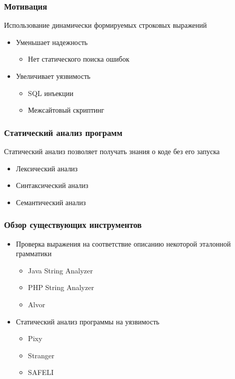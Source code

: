 \documentclass{beamer}
\begin{document}
\begin{frame}
\transwipe[direction=90]
\frametitle{Мотивация}
Использование динамически формируемых строковых выражений
\begin{itemize}
\item Уменьшает надежность
\begin{itemize}
\item Нет статического поиска ошибок
\end{itemize}
\item Увеличивает уязвимость
\begin{itemize}
\item SQL инъекции
\item Межсайтовый скриптинг
\end{itemize}
\end{itemize}
\end{frame}


\begin{frame}
\transwipe[direction=90]
\frametitle{Статический анализ программ}
Статический анализ позволяет получать знания о коде без его запуска
\begin{itemize}
\item Лексический анализ
\item Синтаксический анализ 
\item Семантический анализ
\end{itemize}
\end{frame}


\begin{frame}
\transwipe[direction=90]
\frametitle{Обзор существующих инструментов}
\begin{itemize}
\item Проверка выражения на соответствие описанию некоторой эталонной грамматики
\begin{itemize}
\item Java String Analyzer
\item PHP String Analyzer
\item Alvor
\end{itemize}

\item Статический анализ программы на уязвимость
\begin{itemize}
\item Pixy
\item Stranger
\item SAFELI
\end{itemize}
\end{itemize}
\end{frame}
\end{document}
